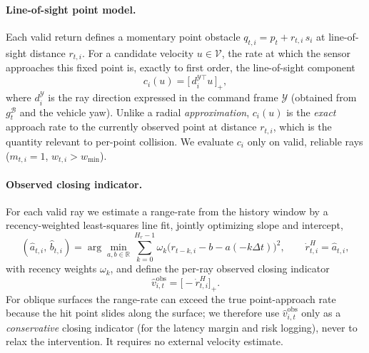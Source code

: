 \documentclass[11pt]{article}
\begin{document}
\paragraph{Line-of-sight point model.}
Each valid return defines a momentary point obstacle
$q_{t,i} = p_t + r_{t,i}\,s_i$ at line-of-sight distance $r_{t,i}$. For a
candidate velocity $u\in\mathcal{V}$, the rate at which the sensor approaches
this fixed point is, exactly to first order, the line-of-sight component
\begin{equation}
    c_i(u) = \bigl[\,d_i^{\mathcal{Y}\top} u\,\bigr]_+ ,
    \label{eq:commanded_closing_ray}
\end{equation}
where $d_i^{\mathcal{Y}}$ is the ray direction expressed in the command frame
$\mathcal{Y}$ (obtained from $g^{\mathcal{B}}_t$ and the vehicle yaw). Unlike a
radial \emph{approximation}, $c_i(u)$ is the \emph{exact} approach rate to the
currently observed point at distance $r_{t,i}$, which is the quantity relevant
to per-point collision. We evaluate $c_i$ only on valid, reliable rays
($m_{t,i}=1$, $w_{t,i}>w_{\min}$).

\paragraph{Observed closing indicator.}
For each valid ray we estimate a range-rate from the history window by a
recency-weighted least-squares line fit, jointly optimizing slope and intercept,
\begin{equation}
    (\hat a_{t,i},\,\hat b_{t,i})
    = \arg\min_{a,b\in\mathbb{R}}
    \sum_{k=0}^{H_r-1} \omega_k
    \bigl(r_{t-k,i} - b - a(-k\Delta t)\bigr)^2,
    \qquad
    \dot r^{H}_{t,i} = \hat a_{t,i},
    \label{eq:range_rate_fit}
\end{equation}
with recency weights $\omega_k$, and define the per-ray observed closing
indicator
\begin{equation}
    \hat v^{\mathrm{obs}}_{i,t} = \bigl[-\dot r^{H}_{t,i}\bigr]_+ .
    \label{eq:observed_closing_speed}
\end{equation}
For oblique surfaces the range-rate can exceed the true point-approach rate
because the hit point slides along the surface; we therefore use
$\hat v^{\mathrm{obs}}_{i,t}$ only as a \emph{conservative} closing indicator
(for the latency margin and risk logging), never to relax the intervention. It
requires no external velocity estimate.
\end{document}
